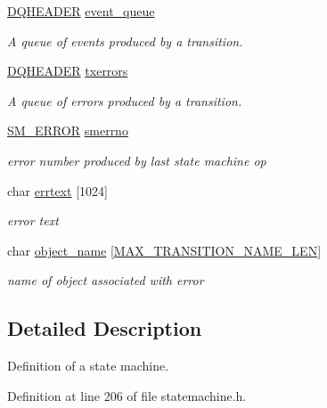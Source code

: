 \begin{DoxyCompactItemize}
\hyperlink{struct_d_q_h_e_a_d_e_r}{D\-Q\-H\-E\-A\-D\-E\-R} \hyperlink{struct__state__table_aadba63f32267a050d2519727a7af1118}{event\-\_\-queue}
\begin{DoxyCompactList}\small\item\em A queue of events produced by a transition. \end{DoxyCompactList}\item 
\hyperlink{struct_d_q_h_e_a_d_e_r}{D\-Q\-H\-E\-A\-D\-E\-R} \hyperlink{struct__state__table_a706136e01bcc519c6362006786324228}{txerrors}
\begin{DoxyCompactList}\small\item\em A queue of errors produced by a transition. \end{DoxyCompactList}\item 
\hyperlink{statemachine_8h_a70482ff48418e4ab7788b695da116f0d}{S\-M\-\_\-\-E\-R\-R\-O\-R} \hyperlink{struct__state__table_af4ee1f3bcd55f0bfd85db2c6443a76a4}{smerrno}
\begin{DoxyCompactList}\small\item\em error number produced by last state machine op \end{DoxyCompactList}\item 
char \hyperlink{struct__state__table_ae42183c10523c27cabfff280768cad3d}{errtext} \mbox{[}1024\mbox{]}
\begin{DoxyCompactList}\small\item\em error text \end{DoxyCompactList}\item 
char \hyperlink{struct__state__table_a559a3e26f02300e699f580595fcf06c0}{object\-\_\-name} \mbox{[}\hyperlink{statemachine_8h_a7e57d2821960341f4eba42256a1f5417}{M\-A\-X\-\_\-\-T\-R\-A\-N\-S\-I\-T\-I\-O\-N\-\_\-\-N\-A\-M\-E\-\_\-\-L\-E\-N}\mbox{]}
\begin{DoxyCompactList}\small\item\em name of object associated with error \end{DoxyCompactList}\end{DoxyCompactItemize}


\subsection{Detailed Description}
Definition of a state machine. 

Definition at line 206 of file statemachine.\-h.



